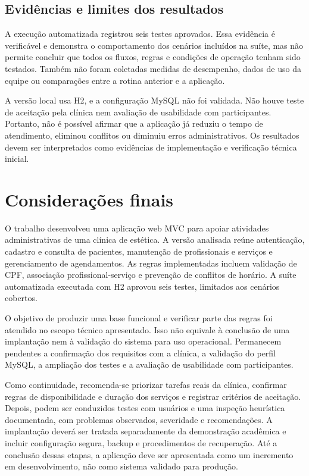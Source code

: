 \documentclass[12pt,a4paper]{article}
\begin{document}
\subsection{Evidências e limites dos resultados}

A execução automatizada registrou seis testes aprovados. Essa evidência é verificável e demonstra o comportamento dos cenários incluídos na suíte, mas não permite concluir que todos os fluxos, regras e condições de operação tenham sido testados. Também não foram coletadas medidas de desempenho, dados de uso da equipe ou comparações entre a rotina anterior e a aplicação.

A versão local usa H2, e a configuração MySQL não foi validada. Não houve teste de aceitação pela clínica nem avaliação de usabilidade com participantes. Portanto, não é possível afirmar que a aplicação já reduziu o tempo de atendimento, eliminou conflitos ou diminuiu erros administrativos. Os resultados devem ser interpretados como evidências de implementação e verificação técnica inicial.

\section{Considerações finais}

O trabalho desenvolveu uma aplicação web MVC para apoiar atividades administrativas de uma clínica de estética. A versão analisada reúne autenticação, cadastro e consulta de pacientes, manutenção de profissionais e serviços e gerenciamento de agendamentos. As regras implementadas incluem validação de CPF, associação profissional-serviço e prevenção de conflitos de horário. A suíte automatizada executada com H2 aprovou seis testes, limitados aos cenários cobertos.

O objetivo de produzir uma base funcional e verificar parte das regras foi atendido no escopo técnico apresentado. Isso não equivale à conclusão de uma implantação nem à validação do sistema para uso operacional. Permanecem pendentes a confirmação dos requisitos com a clínica, a validação do perfil MySQL, a ampliação dos testes e a avaliação de usabilidade com participantes.

Como continuidade, recomenda-se priorizar tarefas reais da clínica, confirmar regras de disponibilidade e duração dos serviços e registrar critérios de aceitação. Depois, podem ser conduzidos testes com usuários e uma inspeção heurística documentada, com problemas observados, severidade e recomendações. A implantação deverá ser tratada separadamente da demonstração acadêmica e incluir configuração segura, backup e procedimentos de recuperação. Até a conclusão dessas etapas, a aplicação deve ser apresentada como um incremento em desenvolvimento, não como sistema validado para produção.
\end{document}
